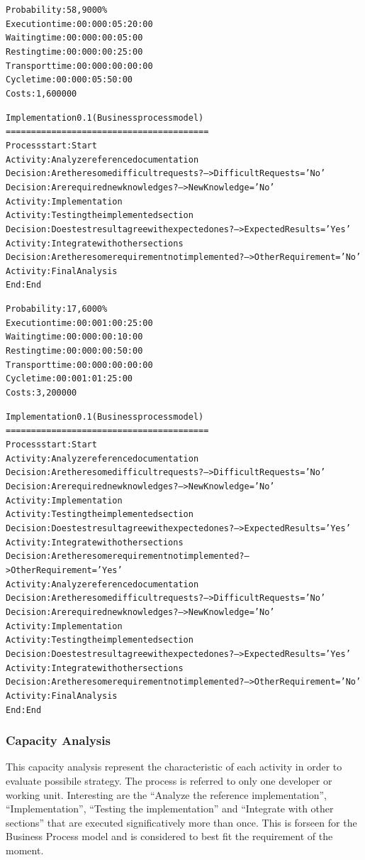\begin{alltt}
Probability:   58,9000\%
Execution time:  00:000:05:20:00
Waiting time:  00:000:00:05:00
Resting time:  00:000:00:25:00
Transport time:  00:000:00:00:00
Cycle time:  00:000:05:50:00
Costs:  1,600000

Implementation 0.1 (Business process model)
========================================
Process start: Start
Activity: Analyze reference documentation
Decision: Are there some difficult requests? --> DifficultRequests='No'
Decision: Are required new knowledges? --> NewKnowledge='No'
Activity: Implementation
Activity: Testing the implemented section
Decision: Does test result agree with expected ones? --> ExpectedResults='Yes'
Activity: Integrate with other sections
Decision: Are there some requirement not implemented? --> OtherRequirement='No'
Activity: Final Analysis
End: End
\end{alltt}

\begin{alltt}
Probability:   17,6000\%
Execution time:  00:001:00:25:00
Waiting time:  00:000:00:10:00
Resting time:  00:000:00:50:00
Transport time:  00:000:00:00:00
Cycle time:  00:001:01:25:00
Costs:  3,200000

Implementation 0.1 (Business process model)
========================================
Process start: Start
Activity: Analyze reference documentation
Decision: Are there some difficult requests? --> DifficultRequests='No'
Decision: Are required new knowledges? --> NewKnowledge='No'
Activity: Implementation
Activity: Testing the implemented section
Decision: Does test result agree with expected ones? --> ExpectedResults='Yes'
Activity: Integrate with other sections
Decision: Are there some requirement not implemented? --> OtherRequirement='Yes'
Activity: Analyze reference documentation
Decision: Are there some difficult requests? --> DifficultRequests='No'
Decision: Are required new knowledges? --> NewKnowledge='No'
Activity: Implementation
Activity: Testing the implemented section
Decision: Does test result agree with expected ones? --> ExpectedResults='Yes'
Activity: Integrate with other sections
Decision: Are there some requirement not implemented? --> OtherRequirement='No'
Activity: Final Analysis
End: End
\end{alltt}



\subsubsection{Capacity Analysis}
This capacity analysis represent the characteristic of each activity in order to evaluate possibile strategy. The process is referred to only one developer or working unit. Interesting are the ``Analyze the reference implementation'', ``Implementation'', ``Testing the implementation'' and ``Integrate with other sections'' that are executed significatively more than once. This is forseen for the Business Process model and is considered to best fit the requirement of the moment.

